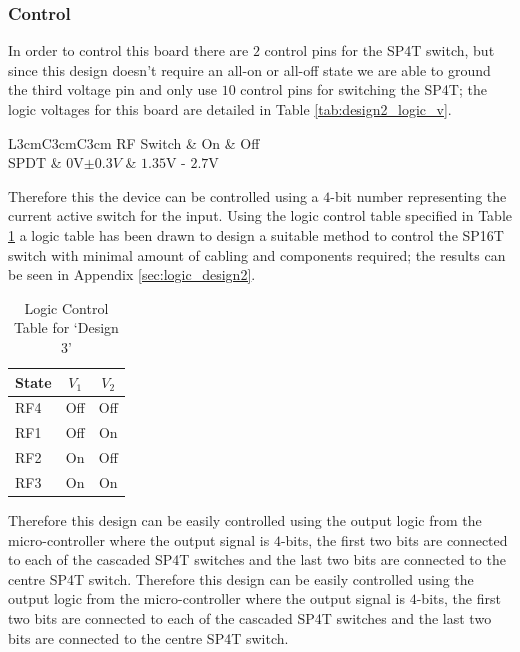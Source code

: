 \documentclass[12pt,openany,a4paper]{book}
\begin{document}
\subsubsection{Control}
In order to control this board there are $2$ control pins for the SP4T switch, but since this design doesn't require an all-on or all-off state we are able to ground the third voltage pin and only use $10$ control pins for switching the SP4T; the logic voltages for this board are detailed in Table \ref{tab:design2_logic_v}.
\begin{table}[H]
	\centering
	\begin{tabular}{L{3cm}C{3cm}C{3cm}}
	\hline
	RF Switch & On & Off\\
	\hline
	SPDT & $0$V$\pm 0.3V$ & $1.35$V - $2.7$V \\
	\hline	
	\end{tabular}
	\caption{Logic Voltage Control}
	\label{tab:design2_logic_v}
\end{table}
Therefore this the device can be controlled using a $4$-bit number representing the current active switch for the input. Using the logic control table specified in Table \ref{tab:logic-cont-design3} a logic table has been drawn to design a suitable method to control the SP16T switch with minimal amount of cabling and components required; the results can be seen in Appendix \ref{sec:logic_design2}. 
\begin{table}[H]
	\centering
	\begin{tabular}{l c c }
		\hline
		State & $V_1$ & $V_2$\\
		\hline
		RF4 & Off & Off \\
		RF1 & Off & On \\
		RF2 & On & Off\\
		RF3 & On & On	\\	
		\hline
	\end{tabular}
    \caption{Logic Control Table for `Design 3'} \label{tab:logic-cont-design3}
\end{table}
Therefore this design can be easily controlled using the output logic from the micro-controller where the output signal is $4$-bits, the first two bits are connected to each of the cascaded SP4T switches and the last two bits are connected to the centre SP4T switch. Therefore this design can be easily controlled using the output logic from the micro-controller where the output signal is $4$-bits, the first two bits are connected to each of the cascaded SP4T switches and the last two bits are connected to the centre SP4T switch.
\end{document}

